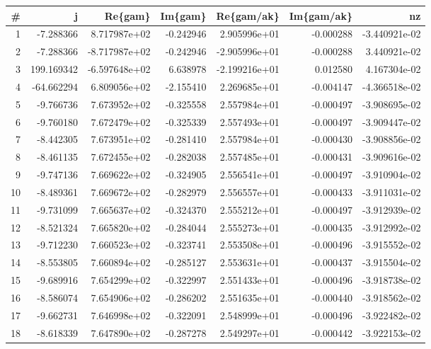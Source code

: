 \begin{tabular}{rrrrrrr}
\toprule
   \# &          j &       Re\{gam\} &   Im\{gam\} &    Re\{gam/ak\} &  Im\{gam/ak\} &            nz \\
\midrule
   1 &  -7.288366 &  8.717987e+02 & -0.242946 &  2.905996e+01 &   -0.000288 & -3.440921e-02 \\
   2 &  -7.288366 & -8.717987e+02 & -0.242946 & -2.905996e+01 &   -0.000288 &  3.440921e-02 \\
   3 & 199.169342 & -6.597648e+02 &  6.638978 & -2.199216e+01 &    0.012580 &  4.167304e-02 \\
   4 & -64.662294 &  6.809056e+02 & -2.155410 &  2.269685e+01 &   -0.004147 & -4.366518e-02 \\
   5 &  -9.766736 &  7.673952e+02 & -0.325558 &  2.557984e+01 &   -0.000497 & -3.908695e-02 \\
   6 &  -9.760180 &  7.672479e+02 & -0.325339 &  2.557493e+01 &   -0.000497 & -3.909447e-02 \\
   7 &  -8.442305 &  7.673951e+02 & -0.281410 &  2.557984e+01 &   -0.000430 & -3.908856e-02 \\
   8 &  -8.461135 &  7.672455e+02 & -0.282038 &  2.557485e+01 &   -0.000431 & -3.909616e-02 \\
   9 &  -9.747136 &  7.669622e+02 & -0.324905 &  2.556541e+01 &   -0.000497 & -3.910904e-02 \\
  10 &  -8.489361 &  7.669672e+02 & -0.282979 &  2.556557e+01 &   -0.000433 & -3.911031e-02 \\
  11 &  -9.731099 &  7.665637e+02 & -0.324370 &  2.555212e+01 &   -0.000497 & -3.912939e-02 \\
  12 &  -8.521324 &  7.665820e+02 & -0.284044 &  2.555273e+01 &   -0.000435 & -3.912992e-02 \\
  13 &  -9.712230 &  7.660523e+02 & -0.323741 &  2.553508e+01 &   -0.000496 & -3.915552e-02 \\
  14 &  -8.553805 &  7.660894e+02 & -0.285127 &  2.553631e+01 &   -0.000437 & -3.915504e-02 \\
  15 &  -9.689916 &  7.654299e+02 & -0.322997 &  2.551433e+01 &   -0.000496 & -3.918738e-02 \\
  16 &  -8.586074 &  7.654906e+02 & -0.286202 &  2.551635e+01 &   -0.000440 & -3.918562e-02 \\
  17 &  -9.662731 &  7.646998e+02 & -0.322091 &  2.548999e+01 &   -0.000496 & -3.922482e-02 \\
  18 &  -8.618339 &  7.647890e+02 & -0.287278 &  2.549297e+01 &   -0.000442 & -3.922153e-02 \\

\end{tabular}
